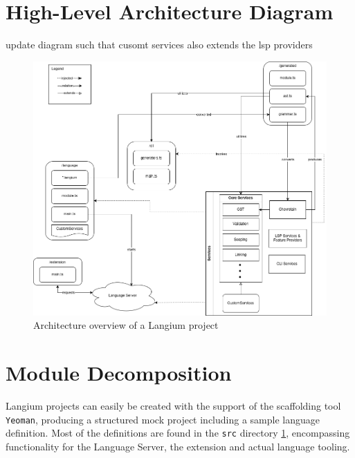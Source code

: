 \section{High-Level Architecture Diagram}
update diagram such that cusomt services also extends the lsp providers
\begin{figure}[ht]
  \centering
  \includegraphics[width=\textwidth]{graphics/langiumArchitecture.png}
  \caption{Architecture overview of a Langium project}
  \label{fig:langium-architecture}
\end{figure}


\section{Module Decomposition}

Langium projects can easily be created with the support of the scaffolding tool \verb|Yeoman|, producing a structured mock project including a sample language definition.
Most of the definitions are found in the \verb|src| directory \ref{fig:langium-architecture}, encompassing functionality for the Language Server, the extension and actual language tooling.

